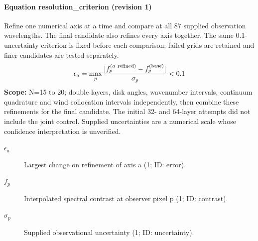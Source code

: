 \paragraph{Equation resolution\_criterion (revision 1)}
Refine one numerical axis at a time and compare at all 87 supplied observation wavelengths. The final candidate also refines every axis together. The same 0.1-uncertainty criterion is fixed before each comparison; failed grids are retained and finer candidates are tested separately.
\begin{equation}
\begin{aligned}
\epsilon_a=\max_{p}\frac{|f_p^{(a\ {\rm refined})}-f_p^{({\rm base})}|}{\sigma_p}<0.1
\end{aligned}
\label{eq:escape.nlte_5f_spectrum:resolution_5f_criterion:1}
\end{equation}
\noindent\textbf{Scope:} N=15 to 20; double layers, disk angles, wavenumber intervals, continuum quadrature and wind collocation intervals independently, then combine these refinements for the final candidate. The initial 32- and 64-layer attempts did not include the joint control. Supplied uncertainties are a numerical scale whose confidence interpretation is unverified.

\begin{description}
\item[$\epsilon_a$] Largest change on refinement of axis a (1; ID: error).
\item[$f_p$] Interpolated spectral contrast at observer pixel p (1; ID: contrast).
\item[$\sigma_p$] Supplied observational uncertainty (1; ID: uncertainty).
\end{description}
